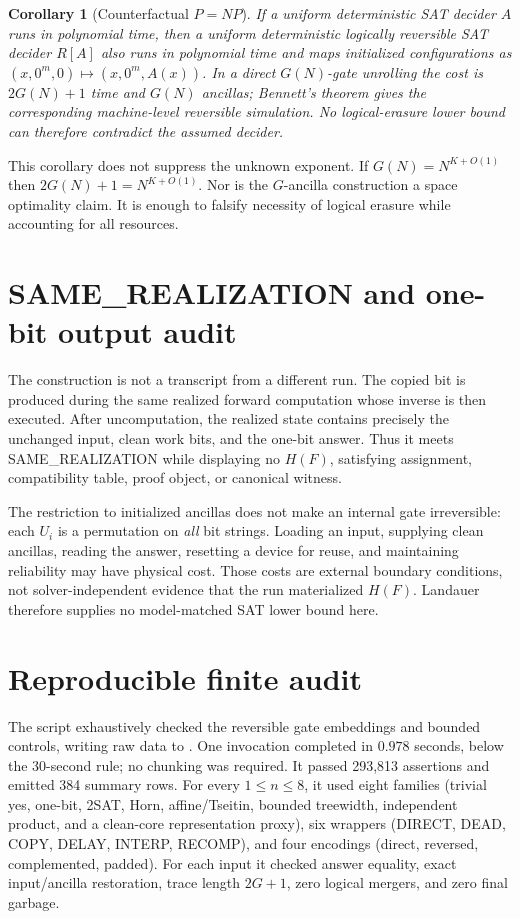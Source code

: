 \documentclass[11pt]{article}
\newtheorem{corollary}[theorem]{Corollary}
\begin{document}
\begin{corollary}[Counterfactual $P=NP$]
If a uniform deterministic SAT decider $A$ runs in polynomial time, then a
uniform deterministic logically reversible SAT decider $R[A]$ also runs in
polynomial time and maps initialized configurations as
$(x,0^m,0)\mapsto(x,0^m,A(x))$.  In a direct $G(N)$-gate unrolling the cost is
$2G(N)+1$ time and $G(N)$ ancillas; Bennett's theorem gives the corresponding
machine-level reversible simulation.  No logical-erasure lower bound can
therefore contradict the assumed decider.
\end{corollary}

This corollary does not suppress the unknown exponent.  If $G(N)=N^{K+O(1)}$
then $2G(N)+1=N^{K+O(1)}$.  Nor is the $G$-ancilla construction a space
optimality claim.  It is enough to falsify necessity of logical erasure while
accounting for all resources.

\section{SAME\_REALIZATION and one-bit output audit}
The construction is not a transcript from a different run.  The copied bit
is produced during the same realized forward computation whose inverse is
then executed.  After uncomputation, the realized state contains precisely
the unchanged input, clean work bits, and the one-bit answer.  Thus it meets
SAME\_REALIZATION while displaying no $H(F)$, satisfying assignment,
compatibility table, proof object, or canonical witness.

The restriction to initialized ancillas does not make an internal gate
irreversible: each $U_i$ is a permutation on \emph{all} bit strings.  Loading
an input, supplying clean ancillas, reading the answer, resetting a device for
reuse, and maintaining reliability may have physical cost.  Those costs are
external boundary conditions, not solver-independent evidence that the run
materialized $H(F)$.  Landauer therefore supplies no model-matched SAT lower
bound here.

\section{Reproducible finite audit}
The script
 exhaustively
checked the reversible gate embeddings and bounded controls, writing raw data
to
.
One invocation completed in $0.978$ seconds, below the 30-second rule; no
chunking was required.  It passed 293,813 assertions and emitted 384 summary
rows.  For every $1\le n\le8$, it used eight families (trivial yes, one-bit,
2SAT, Horn, affine/Tseitin, bounded treewidth, independent product, and a
clean-core representation proxy), six wrappers (DIRECT, DEAD, COPY, DELAY,
INTERP, RECOMP), and four encodings (direct, reversed, complemented, padded).
For each input it checked answer equality, exact input/ancilla restoration,
trace length $2G+1$, zero logical mergers, and zero final garbage.
\end{document}
